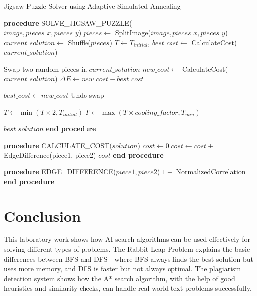 \documentclass[conference]{IEEEtran}
\begin{document}
\begin{algorithm}[h]
\caption{Jigsaw Puzzle Solver using Adaptive Simulated Annealing}
\begin{algorithmic}[1]
\STATE \textbf{procedure} SOLVE\_JIGSAW\_PUZZLE(\\
$image, pieces\_x, pieces\_y$)
\STATE $pieces \leftarrow$ SplitImage($image, pieces\_x, pieces\_y$)
\STATE $current\_solution \leftarrow$ Shuffle($pieces$)
\STATE $T \leftarrow T_{initial}$, $best\_cost \leftarrow$ CalculateCost($current\_solution$)

    \STATE Swap two random pieces in $current\_solution$
    \STATE $new\_cost \leftarrow$ CalculateCost($current\_solution$)
    \STATE $\Delta E \leftarrow new\_cost - best\_cost$
    
            \STATE $best\_cost \leftarrow new\_cost$
        \ENDIF
    \ELSE
        \STATE Undo swap
    \ENDIF
    
        \STATE $T \leftarrow \min(T \times 2, T_{initial})$  
    \ELSE
        \STATE $T \leftarrow \max(T \times cooling\_factor, T_{min})$
    \ENDIF
\ENDFOR

\RETURN $best\_solution$
\STATE \textbf{end procedure}

\STATE
\STATE \textbf{procedure} CALCULATE\_COST($solution$)
\STATE $cost \leftarrow 0$
    \STATE $cost \leftarrow cost +$ EdgeDifference(piece1, piece2)
\ENDFOR
\RETURN $cost$
\STATE \textbf{end procedure}

\STATE
\STATE \textbf{procedure} EDGE\_DIFFERENCE($piece1, piece2$)
\RETURN $1 -$ NormalizedCorrelation
\STATE \textbf{end procedure}
\end{algorithmic}
\end{algorithm}




\section{Conclusion}
This laboratory work shows how AI search algorithms can be used effectively for solving different types of problems. The Rabbit Leap Problem explains the basic differences between BFS and DFS—where BFS always finds the best solution but uses more memory, and DFS is faster but not always optimal. The plagiarism detection system shows how the A* search algorithm, with the help of good heuristics and similarity checks, can handle real-world text problems successfully.
\end{document}
